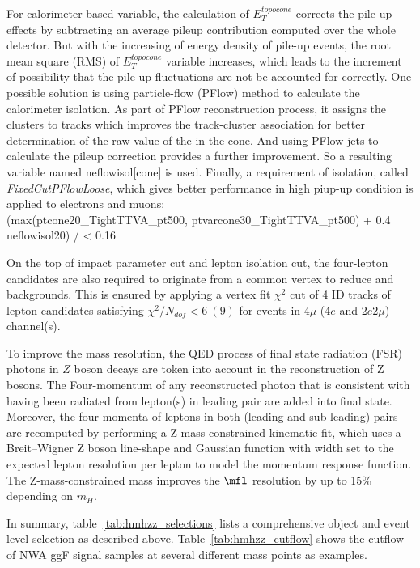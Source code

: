 For calorimeter-based variable, the calculation of $E_{T}^{topocone}$ corrects the pile-up effects by subtracting an average pileup contribution computed over the whole detector.
But with the increasing of energy density of pile-up events, the root mean square (RMS) of $E_{T}^{topocone}$ variable increases,
which leads to the increment of possibility that the pile-up fluctuations are not be accounted for correctly.
One possible solution is using particle-flow (PFlow) method to calculate the calorimeter isolation.
As part of PFlow reconstruction process, it assigns the clusters to tracks which improves the track-cluster association for better determination of the raw value of the \et in the cone.
And using PFlow jets to calculate the pileup correction provides a further improvement.
So a resulting variable named neflowisol[cone] is used.
Finally, a requirement of isolation, called \textit{FixedCutPFlowLoose}, which gives better performance in high piup-up condition is applied to electrons and muons:\\
(max(ptcone20\_TightTTVA\_pt500, ptvarcone30\_TightTTVA\_pt500) + 0.4 \times neflowisol20) / \pt < 0.16

On the top of impact parameter cut and lepton isolation cut, the four-lepton candidates are also required to originate from a common vertex to reduce \Zjet and \ttbar backgrounds.
This is ensured by applying a vertex fit $\chi^2$ cut of 4 ID tracks of lepton candidates satisfying $\chi^2 / N_{dof} < 6~(9)$ for events in 4$\mu$ (4$e$ and 2$e$2$\mu$) channel(s).

To improve the mass resolution, the QED process of final state radiation (FSR) photons in $Z$ boson decays are token into account in the reconstruction of Z bosons.
The Four-momentum of any reconstructed photon that is consistent with having been radiated from lepton(s) in leading pair are added into final state.
Moreover, the four-momenta of leptons in both (leading and sub-leading) pairs are recomputed by performing a Z-mass-constrained kinematic fit,
whieh uses a Breit–Wigner Z boson line-shape and Gaussian function with width set to the expected lepton resolution per lepton to model the momentum response function.
The Z-mass-constrained mass improves the $\mfl$ resolution by up to 15\% depending on $m_{H}$.

In summary, table~\ref{tab:hmhzz_selections} lists a comprehensive object and event level selection as described above.
Table~\ref{tab:hmhzz_cutflow} shows the cutflow of NWA ggF signal samples at several different mass points as examples.

